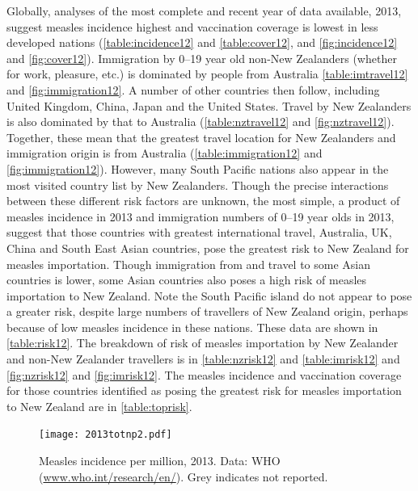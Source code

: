 \documentclass{article}
\begin{document}
Globally, analyses of the most complete and recent year of data available, 2013, suggest measles incidence highest  and vaccination coverage is lowest in less developed nations (\autoref{table:incidence12} and \autoref{table:cover12}, and \autoref{fig:incidence12} and \autoref{fig:cover12}). Immigration by 0--19 year old non-New Zealanders (whether for work, pleasure, etc.) is dominated by people from Australia \autoref{table:imtravel12} and \autoref{fig:immigration12}. A number of other countries then follow, including United Kingdom, China, Japan and the United States. Travel by New Zealanders is also dominated by that to Australia (\autoref{table:nztravel12} and \autoref{fig:nztravel12}). Together, these mean that the greatest travel location for New Zealanders and immigration origin is from Australia (\autoref{table:immigration12} and \autoref{fig:immigration12}). However, many South Pacific nations also appear in the most visited country list by New Zealanders. Though the precise interactions between these different risk factors are unknown, the most simple, a product of measles incidence in 2013 and immigration numbers of 0--19 year olds in 2013, suggest that those countries with greatest international travel, Australia, UK, China and South East Asian countries, pose the greatest risk to New Zealand for measles importation. Though immigration from and travel to some Asian countries is lower, some Asian countries also poses a high risk of measles importation to New Zealand. Note the South Pacific island do not appear to pose a greater risk, despite large numbers of travellers of New Zealand origin, perhaps because of low measles incidence in these nations. These data are shown in \autoref{table:risk12}. The breakdown of risk of measles importation by New Zealander and non-New Zealander travellers is in \autoref{table:nzrisk12} and \autoref{table:imrisk12} and \autoref{fig:nzrisk12} and \autoref{fig:imrisk12}. The measles incidence and vaccination coverage for those countries identified as posing the greatest risk for measles importation to New Zealand are in \autoref{table:toprisk}. 

\begin{figure}
\begin{center}
     \texttt{[image: 2013totnp2.pdf]}
\end{center}
\caption{Measles incidence per million, 2013. Data: WHO (\href{http://www.who.int/research/en/}{www.who.int/research/en/}). Grey indicates not reported.}
\label{fig:incidence12}
\end{figure}
\end{document}

